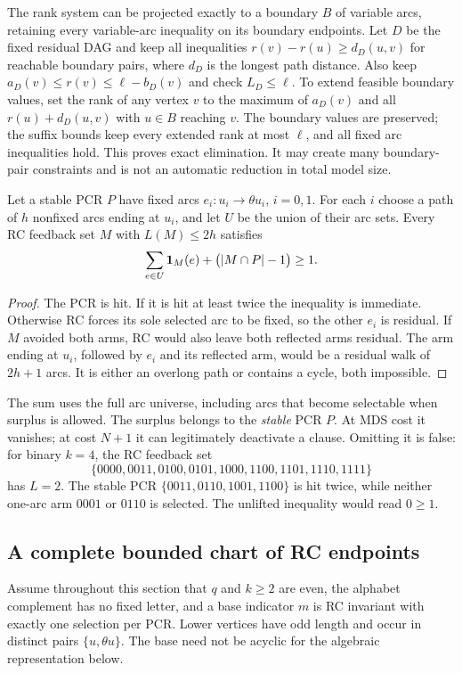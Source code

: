 The rank system can be projected exactly to a boundary $B$ of
variable arcs, retaining every variable-arc inequality on its
boundary endpoints. Let $D$ be the fixed residual DAG and keep all
inequalities $r(v)-r(u)\ge d_D(u,v)$ for reachable boundary pairs,
where $d_D$ is the longest path distance. Also keep
$a_D(v)\le r(v)\le\ell-b_D(v)$ and check $L_D\le\ell$.
To extend feasible boundary values, set the rank of any vertex
$v$ to the maximum of $a_D(v)$ and all
$r(u)+d_D(u,v)$ with $u\in B$ reaching $v$.
The boundary values are preserved; the suffix bounds keep every
extended rank at most $\ell$, and all fixed arc inequalities hold.
This proves exact elimination. It may create many boundary-pair
constraints and is not an automatic reduction in total model size.

\begin{corollary}
\label{cor:surplus-two-arm}
Let a stable PCR $P$ have fixed arcs $e_i:u_i\to\theta u_i$,
$i=0,1$. For each $i$ choose a path of $h$ nonfixed arcs ending
at $u_i$, and let $U$ be the union of their arc sets. Every RC
feedback set $M$ with $L(M)\le2h$ satisfies
\[
 \sum_{e\in U}\mathbf 1_M(e)+\bigl(|M\cap P|-1\bigr)\ge1.
\]
\end{corollary}
\begin{proof}
The PCR is hit. If it is hit at least twice the inequality is
immediate. Otherwise RC forces its sole selected arc to be fixed,
so the other $e_i$ is residual. If $M$ avoided both arms, RC
would also leave both reflected arms residual. The arm ending
at $u_i$, followed by $e_i$ and its reflected arm, would be a
residual walk of $2h+1$ arcs. It is either an overlong path or
contains a cycle, both impossible.
\end{proof}
The sum uses the full arc universe, including arcs that become
selectable when surplus is allowed. The surplus belongs to the
\emph{stable} PCR $P$. At MDS cost it vanishes; at cost $N+1$
it can legitimately deactivate a clause. Omitting it is false:
for binary $k=4$, the RC feedback set
\[
 \{0000,0011,0100,0101,1000,1100,1101,1110,1111\}
\]
has $L=2$. The stable PCR $\{0011,0110,1001,1100\}$ is hit twice,
while neither one-arc arm $0001$ or $0110$ is selected. The
unlifted inequality would read $0\ge1$.

\subsection{A complete bounded chart of RC endpoints}
\label{sec:signed-chart}
Assume throughout this section that $q$ and $k\ge2$ are even,
the alphabet complement has no fixed letter, and a base indicator
$m$ is RC invariant with exactly one selection per PCR. Lower
vertices have odd length and occur in distinct pairs $\{u,\theta u\}$.
The base need not be acyclic for the algebraic representation below.

